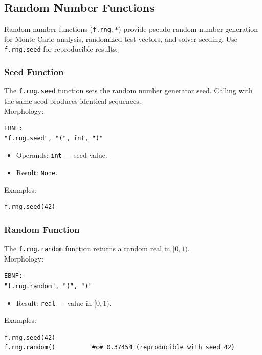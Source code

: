 \subsection{Random Number Functions}

Random number functions (\texttt{f.rng.*}) provide pseudo-random number generation for Monte Carlo analysis, randomized test vectors, and solver seeding. Use \texttt{f.rng.seed} for reproducible results.

\subsubsection{Seed Function}
The \texttt{f.rng.seed} function sets the random number generator seed. Calling with the same seed produces identical sequences. \\
Morphology:
\begin{verbatim}
EBNF:
"f.rng.seed", "(", int, ")"
\end{verbatim}
\begin{itemize}
\item Operands: \texttt{int} --- seed value.
\item Result: \texttt{None}.
\end{itemize}
Examples:
\begin{verbatim}
f.rng.seed(42)
\end{verbatim}

\subsubsection{Random Function}
The \texttt{f.rng.random} function returns a random real in $[0, 1)$. \\
Morphology:
\begin{verbatim}
EBNF:
"f.rng.random", "(", ")"
\end{verbatim}
\begin{itemize}
\item Result: \texttt{real} --- value in $[0, 1)$.
\end{itemize}
Examples:
\begin{verbatim}
f.rng.seed(42)
f.rng.random()          #c# 0.37454 (reproducible with seed 42)
\end{verbatim}


